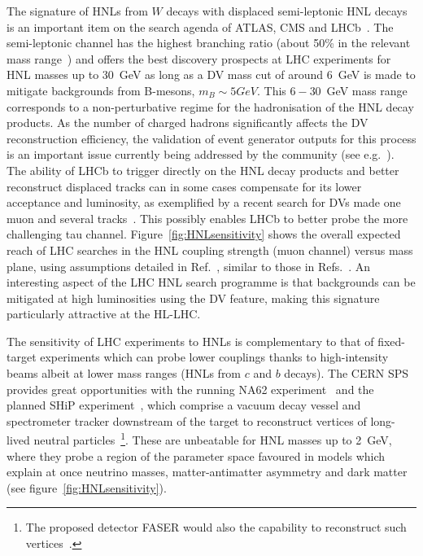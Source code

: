 The signature of HNLs from $W$ decays with displaced semi-leptonic HNL decays is an important item on the search agenda of ATLAS, CMS and LHCb~\cite{Helo2014,Izaguirre2015,Mermod2017,Antusch2017,Nemevsek:2018bbt,Cottin:2018kmq}. The semi-leptonic channel has the highest branching ratio (about 50\% in the relevant mass range~\cite{Gronau1984}) and offers the best discovery prospects at LHC experiments for HNL masses up to 30~GeV as long as a DV mass cut of around 6~GeV is made to mitigate backgrounds from B-mesons, $m_B \sim 5 GeV$. This $6-30$~GeV mass range corresponds to a non-perturbative regime for the hadronisation of the HNL decay products. As the number of charged hadrons significantly affects the DV reconstruction efficiency, the validation of event generator outputs for this process is an important issue currently being addressed by the community (see e.g.~\cite{Cottin:2018kmq}). The ability of LHCb to trigger directly on the HNL decay products and better reconstruct displaced tracks can in some cases compensate for its lower acceptance and luminosity, as exemplified by a recent search for DVs made one muon and several tracks~\cite{LHCb2017,Antusch2017}. This possibly enables LHCb to better probe the more challenging tau channel. Figure~\ref{fig:HNLsensitivity} shows the overall expected reach of LHC searches in the HNL coupling strength (muon channel) versus mass plane, using assumptions detailed in Ref.~\cite{Mermod2017}, similar to those in Refs.~\cite{Helo2014,Izaguirre2015}. An interesting aspect of the LHC HNL search programme is that backgrounds can be mitigated at high luminosities using the DV feature, making this signature particularly attractive at the HL-LHC. 

The sensitivity of LHC experiments to HNLs is complementary to that of fixed-target experiments which can probe lower couplings thanks to high-intensity beams albeit at lower mass ranges (HNLs from $c$ and $b$ decays). The CERN SPS provides great opportunities with the running NA62 experiment~\cite{NA622017a} and the planned SHiP experiment~\cite{SHiP2015}, which comprise a vacuum decay vessel and spectrometer tracker downstream of the target to reconstruct vertices of long-lived neutral particles~\footnote{The proposed detector FASER would also the capability to reconstruct such vertices~\cite{Kling:2018wct}.}. These are unbeatable for HNL masses up to 2~GeV, where they probe a region of the parameter space favoured in models which explain at once neutrino masses, matter-antimatter asymmetry and dark matter~\cite{Asaka2005b,Canetti2013b,Mermod2017b} (see figure~\ref{fig:HNLsensitivity}).

